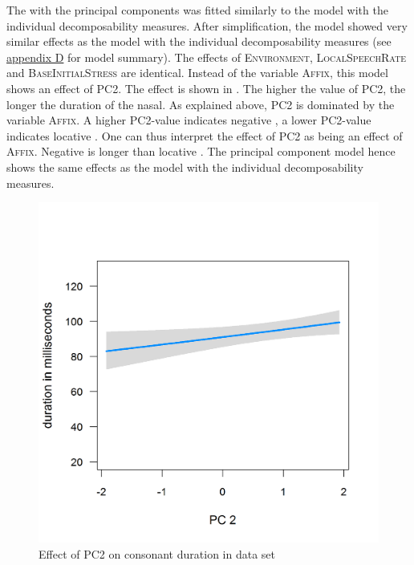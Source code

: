 The  with the principal components was fitted similarly to the model with the individual decomposability measures. After simplification, the model showed very similar effects as the model with the individual decomposability measures (see \hyperref[Appendix D: model summaries corpus]{appendix D} for model summary). The effects of \textsc{Environment}, \textsc{LocalSpeechRate} and \textsc{BaseInitialStress} are identical. Instead of the variable \textsc{Affix}, this model shows an effect of \textsc{PC2}. The effect is shown in . The higher the value of \textsc{PC2}, the longer the duration of the nasal. As explained above, \textsc{PC2} is dominated by the variable \textsc{Affix}. A higher \textsc{PC2}-value indicates negative , a lower \textsc{PC2}-value indicates locative . One can thus interpret the effect of \textsc{PC2} as being an effect of \textsc{Affix}. Negative  is longer than locative . The principal component model hence shows the same effects as the model with the individual decomposability measures.


\begin{figure}
	
	\includegraphics [scale=0.4] {images/Corpus/imPCAbsPC2.png}
	\caption{Effect of PC2 on consonant duration in data set}
	\label{fig:PC2 in Corpus}
\end{figure}



